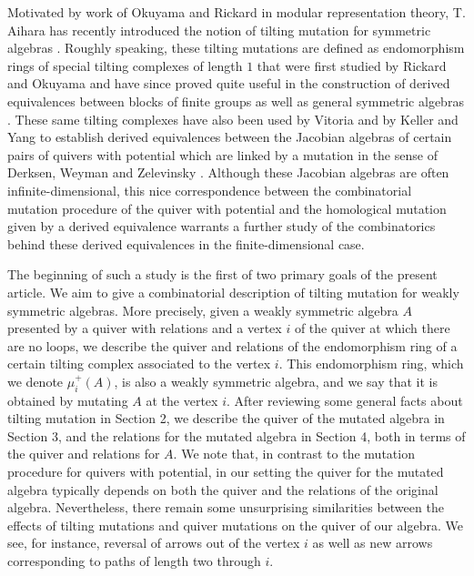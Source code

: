 \documentclass{amsart}
\begin{document}
 Motivated by work of Okuyama and Rickard in modular representation theory, T. Aihara has recently introduced the notion of tilting mutation for symmetric algebras \cite{Aih1}.  Roughly speaking, these tilting mutations are defined as endomorphism rings of special tilting complexes of length $1$ that were first studied by Rickard \cite{DCSE} and Okuyama \cite{Oku} and have since proved quite useful in the construction of derived equivalences between blocks of finite groups as well as general symmetric algebras \cite{RFGT, Holm1, Holm2, TiltSym}.  These same tilting complexes have also been used by Vitoria \cite{Vit} and by Keller and Yang \cite{KellYang} to establish derived equivalences between the Jacobian algebras of certain pairs of quivers with potential which are linked by a mutation in the sense of Derksen, Weyman and Zelevinsky \cite{DWZ}.  Although these Jacobian algebras are often infinite-dimensional, this nice correspondence between the combinatorial mutation procedure of the quiver with potential and the homological mutation given by a derived equivalence warrants a further study of the combinatorics behind these derived equivalences in the finite-dimensional case.
 
The beginning of such a study is the first of two primary goals of the present article.  We aim to give a combinatorial description of tilting mutation for weakly symmetric algebras.  More precisely, given a weakly symmetric algebra $A$ presented by a quiver with relations and a vertex $i$ of the quiver at which there are no loops, we describe the quiver and relations of the endomorphism ring of a certain tilting complex associated to the vertex $i$.  This endomorphism ring, which we denote $\mu^+_i(A)$, is also a weakly symmetric algebra, and we say that it is obtained by mutating $A$ at the vertex $i$.  After reviewing some general facts about tilting mutation in Section 2, we describe the quiver of the mutated algebra in Section 3, and the relations for the mutated algebra in Section 4, both in terms of the quiver and relations for $A$.  We note that, in contrast to the mutation procedure for quivers with potential, in our setting the quiver for the mutated algebra typically depends on both the quiver and the relations of the original algebra.  Nevertheless, there remain some unsurprising similarities between the effects of tilting mutations and quiver mutations on the quiver of our algebra.  We see, for instance, reversal of arrows out of the vertex $i$ as well as new arrows corresponding to paths of length two through $i$.
 
\end{document}
